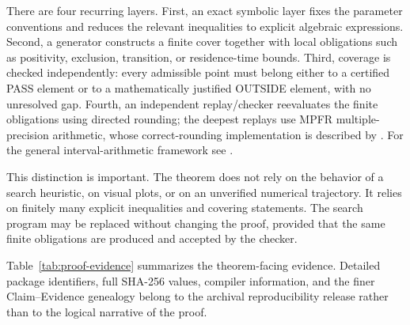 \documentclass[11pt]{article}
\begin{document}
There are four recurring layers. First, an exact symbolic layer fixes the parameter conventions and reduces the relevant inequalities to explicit algebraic expressions. Second, a generator constructs a finite cover together with local obligations such as positivity, exclusion, transition, or residence-time bounds. Third, coverage is checked independently: every admissible point must belong either to a certified PASS element or to a mathematically justified OUTSIDE element, with no unresolved gap. Fourth, an independent replay/checker reevaluates the finite obligations using directed rounding; the deepest replays use MPFR multiple-precision arithmetic, whose correct-rounding implementation is described by \citet{FousseEtAl2007}. For the general interval-arithmetic framework see \citet{Moore1966}.

This distinction is important. The theorem does not rely on the behavior of a search heuristic, on visual plots, or on an unverified numerical trajectory. It relies on finitely many explicit inequalities and covering statements. The search program may be replaced without changing the proof, provided that the same finite obligations are produced and accepted by the checker.

Table~\ref{tab:proof-evidence} summarizes the theorem-facing evidence. Detailed package identifiers, full SHA-256 values, compiler information, and the finer Claim--Evidence genealogy belong to the archival reproducibility release rather than to the logical narrative of the proof.
\end{document}

